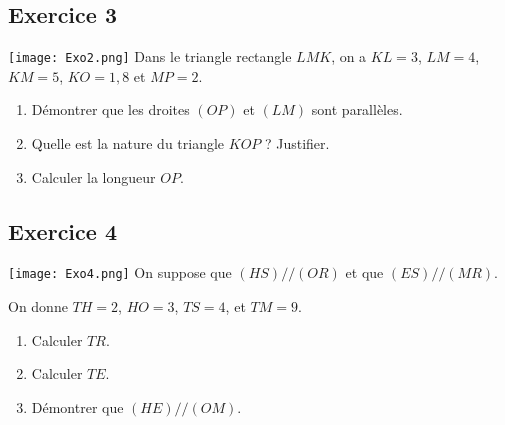 \documentclass[14 pt]{extarticle}
\theoremstyle{plain}
\begin{document}
 \subsection*{Exercice 3}
 
 \texttt{[image: Exo2.png]}\newline
Dans le triangle rectangle $LMK$, on a $KL = 3$, $LM= 4$, $KM=5$, $KO= 1,8$ et $MP= 2$. \begin{enumerate}
\item 
 Démontrer que les droites $(OP)$ et $(LM)$ sont parallèles. 
 \item Quelle est la nature du triangle $KOP$ ? Justifier.
 \item 
 Calculer la longueur $OP$. 
\end{enumerate}

 
 \subsection*{Exercice 4}
 
 \texttt{[image: Exo4.png]}\newline
 On suppose que $(HS)//(OR)$ et que $(ES)//(MR)$. 
 
 On donne $TH = 2$, $HO = 3$, $TS= 4$, et $TM= 9$. 
 
 \begin{enumerate}
 \item Calculer $TR$. 
 \item Calculer $TE$.  
 \item Démontrer que $(HE)//(OM)$. 
 \end{enumerate}
 

 	
\end{document}
